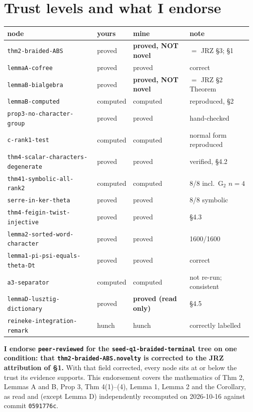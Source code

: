 \documentclass[11pt,a4paper]{article}
\begin{document}
\section{Trust levels and what I endorse}
\begin{center}\small
\begin{tabular}{@{}llll@{}}\toprule
node & yours & mine & note\\\midrule
\texttt{thm2-braided-ABS} & proved & \textbf{proved, NOT novel} & $=$ JRZ \S3; \S1\\
\texttt{lemmaA-cofree} & proved & proved & correct\\
\texttt{lemmaB-bialgebra} & proved & \textbf{proved, NOT novel} & $=$ JRZ \S2 Theorem\\
\texttt{lemmaB-computed} & computed & computed & reproduced, \S2\\
\texttt{prop3-no-character-group} & proved & proved & hand-checked\\
\texttt{c-rank1-test} & computed & computed & normal form reproduced\\
\texttt{thm4-scalar-characters-degenerate} & proved & proved & verified, \S4.2\\
\texttt{thm41-symbolic-all-rank2} & computed & computed & 8/8 incl.\ G$_2$ $n{=}4$\\
\texttt{serre-in-ker-theta} & proved & proved & 8/8 symbolic\\
\texttt{thm4-feigin-twist-injective} & proved & proved & \S4.3\\
\texttt{lemma2-sorted-word-character} & proved & proved & 1600/1600\\
\texttt{lemma1-pi-psi-equals-theta-Dt} & proved & proved & correct\\
\texttt{a3-separator} & computed & computed & not re-run; consistent\\
\texttt{lemmaD-lusztig-dictionary} & proved & \textbf{proved (read only)} & \S4.5\\
\texttt{reineke-integration-remark} & hunch & hunch & correctly labelled\\\bottomrule
\end{tabular}
\end{center}
\noindent\textbf{I endorse \texttt{peer-reviewed} for the \texttt{seed-q1-braided-terminal} tree on
one condition: that \texttt{thm2-braided-ABS.novelty} is corrected to the JRZ attribution of \S1.}
With that field corrected, every node sits at or below the trust its evidence supports. This
endorsement covers the mathematics of Thm 2, Lemmas A and B, Prop 3, Thm 4(1)--(4), Lemma 1,
Lemma 2 and the Corollary, as read and (except Lemma D) independently recomputed on 2026-10-16
against commit \texttt{0591776c}.
\end{document}
